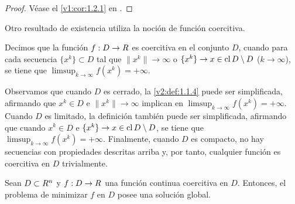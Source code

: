 \begin{proof}
    Véase el \cref{v1:cor:1.2.1} en \cite{izmailov2020otimizacaovolume1}.
\end{proof}

Otro resultado de existencia utiliza la noción de función coercitiva.

\begin{definition}\label{v2:def:1.1.4}
    Decimos que la función $f : D \to R$ es coercitiva en el conjunto $D$, cuando para cada secuencia $\{x^k\} \subset D$ tal que $\|x^k\| \to \infty$ o $\{x^k\} \to x \in \operatorname{cl} D \setminus D$ ($k \to \infty$), se tiene que $\limsup_{k \to \infty} f(x^k) = +\infty$.
\end{definition}

Observamos que cuando $D$ es cerrado, la \cref{v2:def:1.1.4} puede ser simplificada, afirmando que $x^k \in D$ e $\|x^k\| \to \infty$ implican en $\limsup_{k \to \infty} f(x^k) = +\infty$. Cuando $D$ es limitado, la definición también puede ser simplificada, afirmando que cuando $x^k \in D$ e $\{x^k\} \to x \in \operatorname{cl} D \setminus D$, se tiene que $\limsup_{k \to \infty} f(x^k) = +\infty$.
Finalmente, cuando $D$ es compacto, no hay secuencias con propiedades descritas arriba y, por tanto, cualquier función es coercitiva en $D$ trivialmente.

\begin{corollary}\label{v2:cor:1.1.2}
    Sean $D \subset R^n$ y $f : D \to R$ una función continua coercitiva en $D$. Entonces, el problema de minimizar $f$ en $D$ posee una solución global.
\end{corollary}
